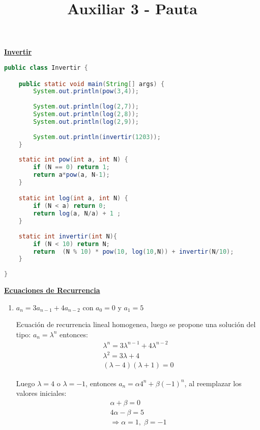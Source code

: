 \documentclass[dcc,uchile,sol]{fcfmcourse}
\title{Auxiliar 3 - Pauta}
\newcommand{\ptitle}[1]{\underline{\textbf{#1}}}
\begin{document}
\maketitle

\vspace{-1ex}


\begin{problems}
\problem \ptitle{Invertir}

\begin{lstlisting}[language=Java, frame=single]
public class Invertir {

	public static void main(String[] args) {
		System.out.println(pow(3,4));
		
		System.out.println(log(2,7));
		System.out.println(log(2,8));
		System.out.println(log(2,9));
			
		System.out.println(invertir(1203));
	}
	
	static int pow(int a, int N) {
		if (N == 0) return 1;
		return a*pow(a, N-1);
	}

	static int log(int a, int N) {
	    if (N < a) return 0;
	    return log(a, N/a) + 1 ;
	}
	
	static int invertir(int N){
		if (N < 10) return N;
		return  (N % 10) * pow(10, log(10,N)) + invertir(N/10);
	}
	
}
\end{lstlisting}


\problem \ptitle{Ecuaciones de Recurrencia}

\begin{enumerate}
    \item $a_n = 3a_{n-1} + 4a_{n-2}$ con $a_0 = 0$ y $a_1 = 5$ 
    
    Ecuación de recurrencia lineal homogenea, luego se propone una solución del tipo:  $a_n = \lambda^n$ entonces:
    \begin{align*}
    \lambda^n = 3\lambda^{n-1} + 4\lambda^{n-2} \\
    \lambda^2 = 3\lambda + 4 \\
    (\lambda - 4)(\lambda + 1) = 0
    \end{align*}
    
    Luego $\lambda = 4$ o $\lambda = -1$, entonces $a_n = \alpha 4^n + \beta (-1)^n$, al reemplazar los valores iniciales:
    \begin{align*}
    \alpha + \beta = 0 \\
    4\alpha - \beta = 5 \\
    \Rightarrow \alpha = 1,\; \beta = -1
    \end{align*}
    

\end{enumerate}
\end{problems}
\end{document}
